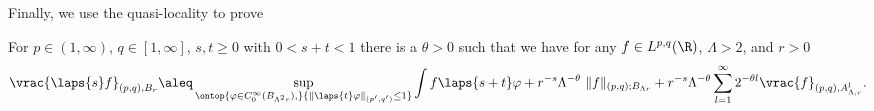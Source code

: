 Finally, we use the quasi-locality to prove

\begin{proposition}\label{pr:localcontrolelliptic}
For $p \in (1,\infty)$, $q \in [1,\infty]$, $s,t \geq 0$ with $0< s+t < 1$
there is a $\theta >0$ such that
we have for any $f \in L^{p,q}(\R)$, $\Lambda > 2$, and $r>0$  
\begin{multline*}
 \vrac{\laps{s} f}_{(p,q), B_r}  \aleq 
  \sup_{\ontop{\varphi \in C_0^\infty(B_{\Lambda^2 r}),}{\|\laps{t}\varphi\|_{(p',q')} \leq 1}}  \int f \laps{s+t} \varphi 
  +  r^{-s}\Lambda^{-\theta}\ \|f\|_{(p,q);B_{\Lambda r}} + r^{-s} 
   \Lambda^{-\theta} \sum_{l=1}^\infty 2^{-\theta l} \vrac{f}_{(p,q),A_{\Lambda, r}^l}.
\end{multline*}
\end{proposition}

